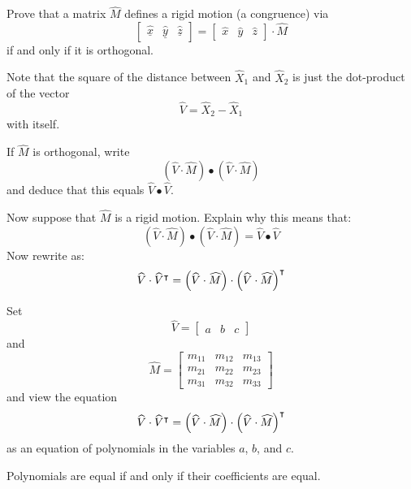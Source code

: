 \documentclass{ximera}
\begin{document}
\begin{problem}
  Prove that a matrix $\hat{M}$ defines a rigid motion (a congruence)
  via
  \[
\begin{bmatrix}
\underline{\hat{x}} & \underline{\hat{y}} & \underline{\hat{z}}%
\end{bmatrix}
=
\begin{bmatrix} \hat{x} & \hat{y} & \hat{z}%
\end{bmatrix}
\cdot\hat{M}
  \]
  if and only if it is orthogonal.

  \begin{hint}
    Note that the square of the distance between $\hat{X}_{1}$ and
    $\hat{X}_{2}$ is just the dot-product of the vector%
    \[
    \hat{V}=\hat{X}_{2}-\hat{X}_{1}%
    \]
    with itself. 
  \end{hint}
  \begin{hint}
    If $\hat{M}$ is orthogonal, write
    \[
    \left(  \hat{V}  \cdot\hat{M} \right) \bullet\left(
    \hat{V}  \cdot\hat{M}\right)
    \]
    and deduce that this equals $\hat{V}\bullet\hat{V}$. 
  \end{hint}
  \begin{hint}
  Now suppose that $\hat{M}$ is a rigid motion. Explain why this means that:
  \[
  \left(  \hat{V}  \cdot\hat{M} \right) \bullet\left(
  \hat{V}  \cdot\hat{M}\right)  =\hat{V}\bullet\hat{V}
  \]
  Now rewrite as:
  \[
  \widehat{V}\cdot\widehat{V}^\intercal= \left(  \widehat{V}  \cdot\widehat{M} \right) \cdot\left(
    \widehat{V}  \cdot\widehat{M}\right)^\intercal 
  \]
  \end{hint}
  \begin{hint} Set
    \[
    \hat{V} =
    \begin{bmatrix}
      a & b & c
    \end{bmatrix}
    \]
    and
    \[
    \hat{M} =
    \begin{bmatrix}
      m_{11} & m_{12} & m_{13}\\
      m_{21} & m_{22} & m_{23}\\
      m_{31} & m_{32} & m_{33}
    \end{bmatrix}
    \]
    and view the equation 
    \[
    \widehat{V}\cdot\widehat{V}^\intercal= \left(  \widehat{V}  \cdot\widehat{M} \right) \cdot\left(
    \widehat{V}  \cdot\widehat{M}\right)^\intercal 
    \]
    as an equation of polynomials in the variables $a$, $b$, and $c$. 
  \end{hint}
  \begin{hint}
    Polynomials are equal if and only if their coefficients are equal. 
  \end{hint}
  

\end{problem}
\end{document}
